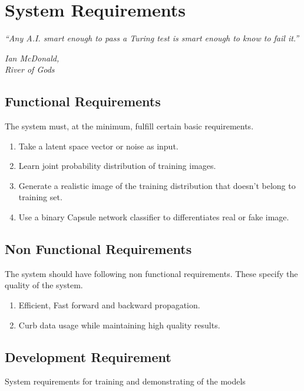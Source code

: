 \chapter{System Requirements}\label{ch:system_requirements}
\epigraph{\textit{\normalsize “Any A.I. smart enough to pass a Turing test is smart enough to know to fail it.”}}{\textit{ \normalsize Ian McDonald,\\ River of Gods}}

\section{Functional Requirements} %
\label{sec:functional_requirements}
The system must, at the minimum, fulfill certain basic requirements.
\begin{enumerate}
    \item Take a latent space vector or noise as input.
    \item Learn joint probability distribution of training images.
    \item Generate a realistic image of the training distribution that doesn't belong to training set.
    \item Use a binary Capsule network classifier to differentiates real or fake image.
\end{enumerate}
\section{Non Functional Requirements} %
\label{sec:non_functional_requirements}
The system should have following non functional requirements. These specify the quality of the system.
\begin{enumerate}
    \item Efficient, Fast forward and backward propagation.
    \item Curb data usage while maintaining high quality results.    
\end{enumerate}

\section{Development Requirement} %
\label{sec:development_requirement}
System requirements for training and demonstrating of the models
